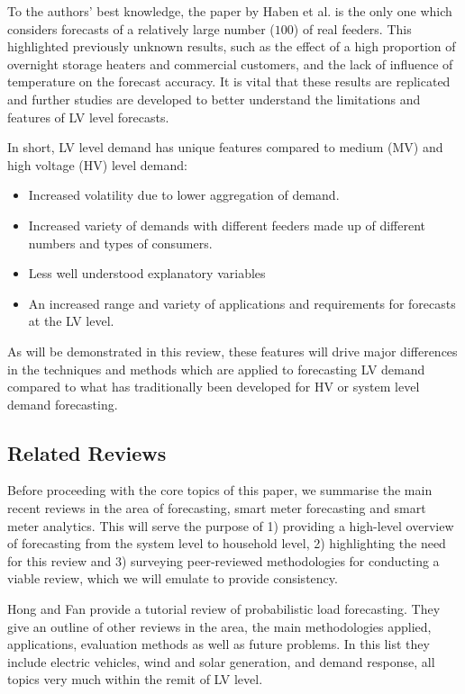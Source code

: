 To the authors' best knowledge, the paper by Haben et al. \cite{Haben2019stl} is the only one which considers forecasts of a relatively large number ($100$) of real feeders. This highlighted previously unknown results, such as the effect of a high proportion of overnight storage heaters and commercial customers, and the lack of influence of temperature on the forecast accuracy. It is vital that these results are replicated and further studies are developed to better understand the limitations and features of LV level forecasts.  

In short, LV level demand has unique features compared to medium (MV) and high voltage (HV) level demand:
\begin{itemize}
	\item Increased volatility due to lower aggregation of demand.
	\item Increased variety of demands with different feeders made up of different numbers and types of consumers.
	\item Less well understood explanatory variables
	\item An increased range and variety of applications and requirements for forecasts at the LV
	level.
\end{itemize}

As will be demonstrated in this review, these features will drive major differences in the techniques and methods which are applied to forecasting LV demand compared to what has traditionally been developed for HV or system level demand forecasting. 


\subsection{Related Reviews}
\label{sec_related_rev}

Before proceeding with the core topics of this paper, we summarise the main recent reviews in the area of forecasting, smart meter forecasting and smart meter analytics. This will serve the purpose of 1) providing a high-level overview of forecasting from the system level to household level, 2) highlighting the need for this review and 3) surveying peer-reviewed methodologies for conducting a viable review, which we will emulate to provide consistency.   

Hong and Fan \cite{Tao2016pel} provide a tutorial review of probabilistic load forecasting. They give an outline of other reviews in the area, the main methodologies applied, applications, evaluation methods as well as future problems. In this list they include electric vehicles, wind and solar generation, and demand response, all topics very much within the remit of LV level.

